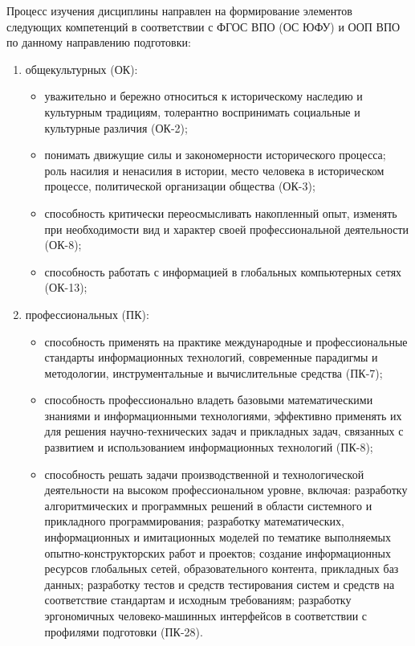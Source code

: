 	\ssect
Процесс изучения дисциплины направлен на формирование элементов следующих компетенций в соответствии с ФГОС ВПО (ОС ЮФУ) и ООП ВПО по данному направлению подготовки:
\begin{enumerate}
\rusitems %
	\item общекультурных (ОК):
	\begin{itemize}
		\item уважительно и бережно относиться к историческому наследию и культурным традициям, толерантно воспринимать социальные и культурные различия (ОК-2);
		\item понимать движущие силы и закономерности исторического процесса; роль насилия и ненасилия в истории, место человека в историческом процессе, политической организации общества (ОК-3);
		\item способность критически переосмысливать накопленный опыт, изменять при необходимости вид и характер своей профессиональной деятельности (ОК-8);
		\item способность работать с информацией в глобальных компьютерных сетях (ОК-13);
	\end{itemize}

	\item профессиональных (ПК):
	\begin{itemize}
		\item способность применять на практике международные и профессиональные стандарты информационных технологий, современные парадигмы и методологии, инструментальные и вычислительные средства (ПК-7);
		\item способность профессионально владеть базовыми математическими знаниями и информационными технологиями, эффективно применять их для решения научно-технических задач и прикладных задач, связанных с развитием и использованием информационных технологий (ПК-8);
		\item способность решать задачи производственной и технологической деятельности на высоком профессиональном уровне, включая: разработку алгоритмических и программных решений в области системного и прикладного программирования; разработку математических, информационных и имитационных моделей по тематике выполняемых опытно-конструкторских работ и проектов; создание информационных ресурсов глобальных сетей, образовательного контента, прикладных баз данных; разработку тестов и средств тестирования систем и средств на соответствие стандартам и исходным требованиям; разработку эргономичных человеко-машинных интерфейсов в соответствии с профилями подготовки (ПК-28).
	\end{itemize}
\end{enumerate}

